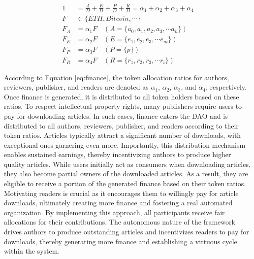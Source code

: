 \documentclass[lettersize,journal]{IEEEtran}
\begin{document}
\begin{equation}
  \begin{aligned}
    1 &= \frac{A}{D} + \frac{E}{D} + \frac{P}{D} + \frac{R}{D} = \alpha_1 + \alpha_2 + \alpha_3 + \alpha_4 \\
    F &\in \{ ETH, Bitcoin, \cdots \} \\
    F_A &= \alpha_1 F \quad (A=\{a_0, a_1, a_2, a_3, \cdots a_n\}) \\
    F_E &= \alpha_2 F \quad (E=\{e_1, e_2, e_3, \cdots e_m\}) \\
    F_P &= \alpha_3 F \quad (P=\{p\}) \\ 
    F_R &= \alpha_4 F \quad (R=\{r_1, r_2, r_3, \cdots r_i\})
  \end{aligned}
  \label{eq:finance}
\end{equation}


According to Equation \ref{eq:finance}, the token allocation ratios for authors, reviewers, publisher, and readers are denoted as $\alpha_1$, $\alpha_2$, $\alpha_3$, and $\alpha_4$, respectively. Once finance is generated, it is distributed to all token holders based on these ratios. 
To respect intellectual property rights, many publishers require users to pay for downloading articles. In such cases, finance enters the DAO and is distributed to all authors, reviewers, publisher, and readers according to their token ratios. Articles typically attract a significant number of downloads, with exceptional ones garnering even more. Importantly, this distribution mechanism enables sustained earnings, thereby incentivizing authors to produce higher quality articles. 
While users initially act as consumers when downloading articles, they also become partial owners of the downloaded articles. As a result, they are eligible to receive a portion of the generated finance based on their token ratios. Motivating readers is crucial as it encourages them to willingly pay for article downloads, ultimately creating more finance and fostering a real automated organization. 
By implementing this approach, all participants receive fair allocations for their contributions. The autonomous nature of the framework drives authors to produce outstanding articles and incentivizes readers to pay for downloads, thereby generating more finance and establishing a virtuous cycle within the system.
\end{document}
